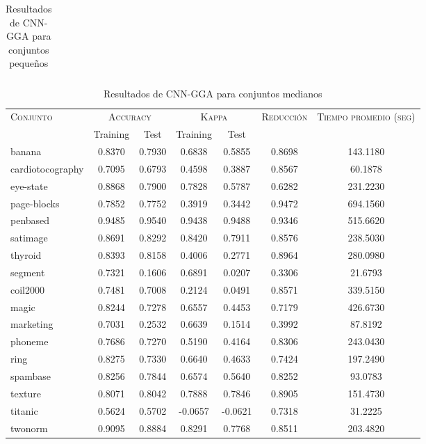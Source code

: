 \begin{table}[]
\begin{tabular}{l c c c c c c}
\hline
\end{tabular}
\caption{Resultados de CNN-GGA para conjuntos pequeños }
\label{res-peq-cnn-gga}
\end{table}



\begin{table}[]
\centering
\begin{tabular}{l c c c c c c}
\hline
\multirow{2}{*}{\textsc{Conjunto}}
	& \multicolumn{2}{c}{\textsc{Accuracy}}
	& \multicolumn{2}{c}{\textsc{Kappa}}
	& \textsc{Reducción}
	& \textsc{Tiempo promedio (seg)} \\
	& Training & Test
	& Training & Test \\ 
\hline
\hline

banana & 0.8370 & 0.7930 & 0.6838 & 0.5855 & 0.8698 & 143.1180 \\
cardiotocography & 0.7095 & 0.6793 & 0.4598 & 0.3887 & 0.8567 & 60.1878 \\
eye-state & 0.8868 & 0.7900 & 0.7828 & 0.5787 & 0.6282 & 231.2230 \\
page-blocks & 0.7852 & 0.7752 & 0.3919 & 0.3442 & 0.9472 & 694.1560 \\
penbased & 0.9485 & 0.9540 & 0.9438 & 0.9488 & 0.9346 & 515.6620 \\
satimage & 0.8691 & 0.8292 & 0.8420 & 0.7911 & 0.8576 & 238.5030 \\
thyroid & 0.8393 & 0.8158 & 0.4006 & 0.2771 & 0.8964 & 280.0980 \\
segment & 0.7321 & 0.1606 & 0.6891 & 0.0207 & 0.3306 & 21.6793 \\
coil2000 & 0.7481 & 0.7008 & 0.2124 & 0.0491 & 0.8571 & 339.5150 \\
magic & 0.8244 & 0.7278 & 0.6557 & 0.4453 & 0.7179 & 426.6730 \\
marketing & 0.7031 & 0.2532 & 0.6639 & 0.1514 & 0.3992 & 87.8192 \\
phoneme & 0.7686 & 0.7270 & 0.5190 & 0.4164 & 0.8306 & 243.0430 \\
ring & 0.8275 & 0.7330 & 0.6640 & 0.4633 & 0.7424 & 197.2490 \\
spambase & 0.8256 & 0.7844 & 0.6574 & 0.5640 & 0.8252 & 93.0783 \\
texture & 0.8071 & 0.8042 & 0.7888 & 0.7846 & 0.8905 & 151.4730 \\
titanic & 0.5624 & 0.5702 & -0.0657 & -0.0621 & 0.7318 & 31.2225 \\
twonorm & 0.9095 & 0.8884 & 0.8291 & 0.7768 & 0.8511 & 203.4820 \\

\hline
\end{tabular}
\caption{Resultados de CNN-GGA para conjuntos medianos }
\label{res-med-cnn-gga}
\end{table}



